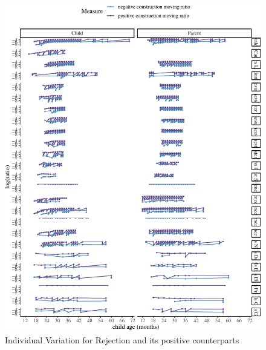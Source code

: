 \documentclass[
  english,
  man,floatsintext]{apa6}
\begin{document}
\begin{figure}[H]

{\centering \includegraphics{neg_construction_article_files/figure-latex/individualemotion-1} 

}

\caption{Individual Variation for  Rejection and its positive counterparts}\label{fig:individualemotion}
\end{figure}
\end{document}
